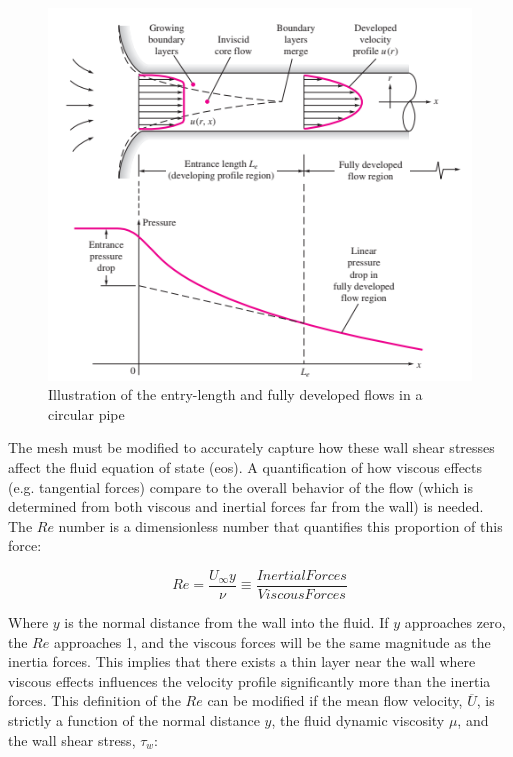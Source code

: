 \documentclass[double,12pt]{beavtex}
\begin{document}
\begin{figure}[!ht]
    \begin{center}
    	\includegraphics[width=13cm]{Figures/Developing_Flow.PNG}
    	\caption{Illustration of the entry-length and fully developed flows in a circular pipe \cite{white_2008}}
    	\label{fig:white_2008}
    	\end{center}
\end{figure}

The mesh must be modified to accurately capture how these wall shear stresses affect the fluid equation of state (\acrshort{eos}). A quantification of how viscous effects (e.g. tangential forces) compare to the overall behavior of the flow (which is determined from both viscous and inertial forces far from the wall) is needed. The $Re$ number is a dimensionless number that quantifies this proportion of this force:

\begin{equation}
    Re = \frac{U_{\infty} y}{\nu} \equiv \frac{Inertial Forces}{Viscous Forces}
\label{eq:Re_Number}
\end{equation}

Where $y$ is the normal distance from the wall into the fluid. If $y$ approaches zero, the $Re$ approaches 1, and the viscous forces will be the same magnitude as the inertia forces. This implies that there exists a thin layer near the wall where viscous effects influences the velocity profile significantly more than the inertia forces. This definition of the $Re$ can be modified if the mean flow velocity, $\overline{U}$, is strictly a function of the normal distance $y$, the fluid dynamic viscosity $\mu$, and the wall shear stress, $\tau_{w}$:
\end{document}
